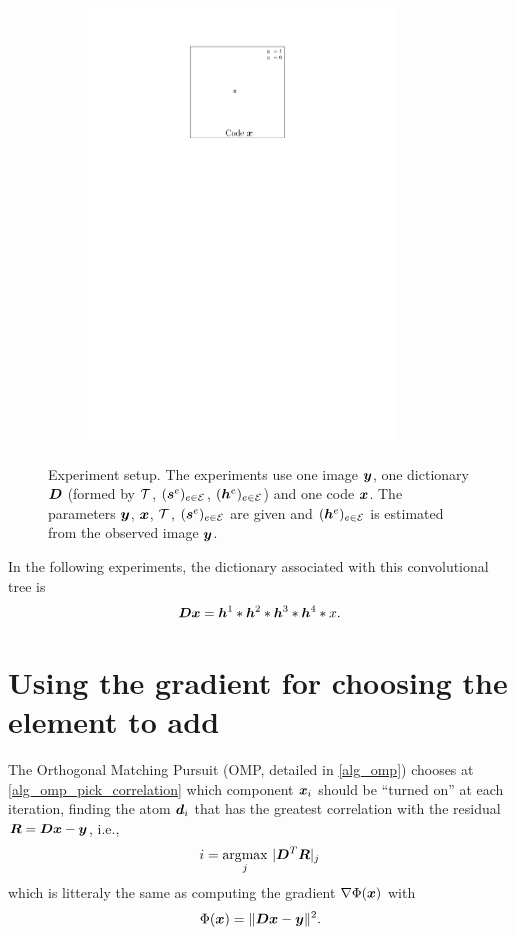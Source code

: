 \begin{figure}[!ht]
\begin{subfigure}[b]{0.32\textwidth}
	\includegraphics[width=0.9\textwidth]{figures/xp_explain/code.pdf}
	\caption{}
\end{subfigure}
\caption{Experiment setup. The experiments use one image $\bm{y}$, one dictionary $\bm{D}$ (formed by $\mathcal T$, $(\bm{s}^e)_{e \in \mathcal E}$, $(\bm{h}^e)_{e \in \mathcal E}$) and one code $\bm{x}$. The parameters $\bm{y}$, $\bm{x}$, $\mathcal T$, $(\bm{s}^e)_{e \in \mathcal E}$ are given and $(\bm{h}^e)_{e \in \mathcal E}$ is estimated from the observed image $\bm{y}$.}\label{fig_xp_explain}
\end{figure}
In the following experiments, the dictionary associated with this convolutional tree is 
\begin{equation*}\bm{D}\bm{x} = \bm{h}^1 * \bm{h}^2 * \bm{h}^3 * \bm{h}^4 * x.\end{equation*}

\section{Using the gradient for choosing the element to add}

The Orthogonal Matching Pursuit (\ac{OMP}, detailed in \cref{alg_omp}) chooses at \cref{alg_omp_pick_correlation} which component $\bm{x}_i$ should be “turned on” at each iteration, finding the atom $\bm{d}_i$ that has the greatest correlation with the residual $\bm{R} = \bm{D}\bm{x} - \bm{y}$, i.e.,
\begin{equation*} i = \underset{j}{\operatorname*{\arg\!\max}} ~ | \bm{D}^T \bm{R} |_j \end{equation*}
which is litteraly the same as computing the gradient $\nabla \Phi(\bm{x})$ with \begin{equation*}\Phi(\bm{x}) = \lVert \bm{D}\bm{x} - \bm{y} \rVert^2.\end{equation*}

